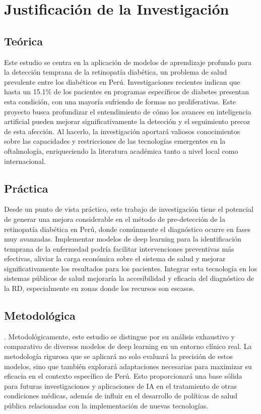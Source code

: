 \section{Justificación de la Investigación}

\subsection{Teórica}
Este estudio se centra en la aplicación de modelos de aprendizaje profundo para la detección temprana de la retinopatía diabética, un problema de salud prevalente entre los diabéticos en Perú. Investigaciones recientes indican que hasta un 15.1\% de los pacientes en programas específicos de diabetes presentan esta condición, con una mayoría sufriendo de formas no proliferativas. Este proyecto busca profundizar el entendimiento de cómo los avances en inteligencia artificial pueden mejorar significativamente la detección y el seguimiento precoz de esta afección. Al hacerlo, la investigación aportará valiosos conocimientos sobre las capacidades y restricciones de las tecnologías emergentes en la oftalmología, enriqueciendo la literatura académica tanto a nivel local como internacional.

\subsection{Práctica}
Desde un punto de vista práctico, este trabajo de investigación tiene el potencial de generar una mejora considerable en  el método de pre-detección de la retinopatía diabética en Perú, donde comúnmente el diagnóstico ocurre en fases muy avanzadas. Implementar modelos de deep learning para la identificación temprana de la enfermedad podría facilitar intervenciones preventivas más efectivas, aliviar la carga económica sobre el sistema de salud y mejorar significativamente los resultados para los pacientes. Integrar esta tecnología en los sistemas públicos de salud mejoraría la accesibilidad y eficacia del diagnóstico de la RD, especialmente en zonas donde los recursos son escasos.

\subsection{Metodológica}. 
Metodológicamente, este estudio se distingue por su análisis exhaustivo y comparativo de diversos modelos de deep learning en un entorno clínico real. La metodología rigurosa que se aplicará no solo evaluará la precisión de estos modelos, sino que también explorará adaptaciones necesarias para maximizar su eficacia en el contexto específico de Perú. Esto proporcionará una base sólida para futuras investigaciones y aplicaciones de IA en el tratamiento de otras condiciones médicas, además de influir en el desarrollo de políticas de salud pública relacionadas con la implementación de nuevas tecnologías.

